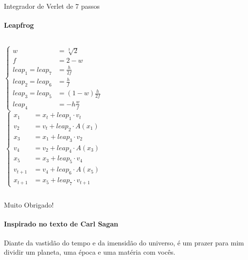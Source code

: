 \documentclass{beamer}
\begin{document}
    \begin{frame}{Integrador de Verlet de 7 passos}
      \framesubtitle{Leapfrog}%
      \begin{columns}[onlytextwidth]
      \[
      \begin{cases}
        w &= \sqrt[3]{2}\\
        f &= 2 - w\\
        leap_1 = leap_7 &= \frac{h}{2f}\\
        leap_2 = leap_6 &= \frac{h}{f}\\
        leap_3 = leap_5 &= (1-w) \frac{h}{2f}\\
        leap_4 &= -h \frac{w}{f}
      \end{cases}
      \]
      \[
      \begin{cases}
      x_{1} &= x_t + leap_1 \cdot v_t\\
      v_{2} &= v_t + leap_2 \cdot A(x_{1})\\
      x_{3} &= x_{1} + leap_3 \cdot v_{2}\\
      v_{4} &= v_{2} + leap_4 \cdot A(x_{3})\\
      x_{5} &= x_{3} + leap_5 \cdot v_{4}\\
      v_{t+1} &= v_{4} + leap_6 \cdot A(x_{5})\\
      x_{t+1} &= x_{5} + leap_7 \cdot v_{t+1}
    \end{cases}
    \]
    \end{columns}
    \end{frame}

    \begin{frame}{Muito Obrigado!}
      \framesubtitle{Inspirado no texto de Carl Sagan}

      \begin{block}{}
        Diante da vastidão do \alert{tempo} e da imensidão do \alert{universo}, é um prazer para mim dividir um \alert{planeta}, uma \alert{época} e uma \alert{matéria} com vocês.
      \end{block}
    \end{frame}
\end{document}
